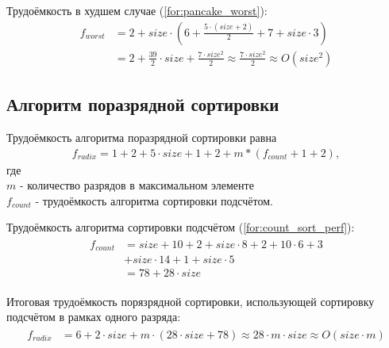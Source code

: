 Трудоёмкость в худшем случае (\ref{for:pancake_worst}):
\begin{align}
	\label{for:pancake_worst}
	f_{worst} &= 2 + size \cdot (6 + \frac{5 \cdot (size + 2)}{2} + 7 + size \cdot 3)  \\
	&= 2 + \frac{39}{2} \cdot size + \frac{7\cdot size^2}{2} \approx \frac{7\cdot size^2}{2} \approx O(size^2)
\end{align}


\subsection{Алгоритм поразрядной сортировки}

Трудоёмкость алгоритма поразрядной сортировки равна %
\begin{align}
	\label{for:radix_sort_perf}
    f_{radix} = 1 + 2 + 5 \cdot size + 1 + 2 + m * (f_{count} + 1 + 2),
\end{align}
где \\
$m$ - количество разрядов в максимальном элементе \\
$f_{count}$ - трудоёмкость алгоритма сортировки подсчётом.


Трудоёмкость алгоритма сортировки подсчётом (\ref{for:count_sort_perf}):
\begin{align}
\begin{split}
	\label{for:count_sort_perf}
    f_{count} &= size + 10  + 2 + size \cdot 8 + 2 + 10 \cdot 6 + 3 \\
    &+ size \cdot 14 + 1 + size \cdot 5 \\
    &= 78 + 28 \cdot size
\end{split}
\end{align}

Итоговая трудоёмкость порязрядной сортировки, использующей сортировку подсчётом в рамках одного разряда: %
\begin{align}
\begin{split}
	\label{for:total_radix}
	f_{radix} &= 6 + 2 \cdot size + m \cdot (28 \cdot size + 78) \approx 28 \cdot m \cdot size \approx O(size\cdot m)
\end{split}
\end{align}

